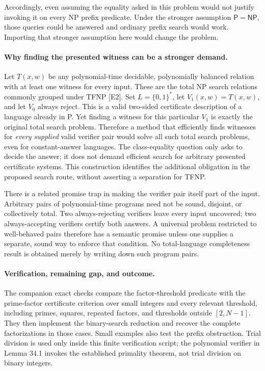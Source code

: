 \documentclass[11pt]{article}
\begin{document}
Accordingly, even assuming the equality asked in this problem would not
justify invoking it on every NP prefix predicate. Under the stronger
assumption $\mathsf P=\mathsf{NP}$, those queries could be answered and
ordinary prefix search would work. Importing that stronger assumption here
would change the problem.

\paragraph{Why finding the presented witness can be a stronger demand.}
Let $T(x,w)$ be any polynomial-time decidable, polynomially balanced relation
with at least one witness for every input. These are the total NP search
 relations commonly grouped under TFNP [E2]. Set $L=\{0,1\}^*$, let
$V_1(x,w)=T(x,w)$, and let $V_0$ always reject. This is a valid two-sided
certificate description of a language already in P. Yet finding a witness
for this particular $V_1$ is exactly the original total search problem.
Therefore a method that efficiently finds witnesses for \emph{every supplied}
valid verifier pair would solve all such total search problems, even for
constant-answer languages. The class-equality question only asks to decide
the answer; it does not demand efficient search for arbitrary presented
certificate systems. This construction identifies the additional obligation
in the proposed search route, without asserting a separation for TFNP.

There is a related promise trap in making the verifier pair itself part of
the input. Arbitrary pairs of polynomial-time programs need not be sound,
disjoint, or collectively total. Two always-rejecting verifiers leave every
input uncovered; two always-accepting verifiers certify both answers. A
universal problem restricted to well-behaved pairs therefore has a semantic
promise unless one supplies a separate, sound way to enforce that condition.
No total-language completeness result is obtained merely by writing down
such program pairs.

\paragraph{Verification, remaining gap, and outcome.}
The companion exact checks compare the factor-threshold predicate with the
prime-factor certificate criterion over small integers and every relevant
threshold, including primes, squares, repeated factors, and thresholds
outside $[2,N-1]$. They then implement the binary-search reduction and
recover the complete factorizations in those cases. Small examples also
test the prefix obstruction. Trial division is used only inside this finite
verification script; the polynomial verifier in Lemma 34.1 invokes the
established primality theorem, not trial division on binary integers.
\end{document}
